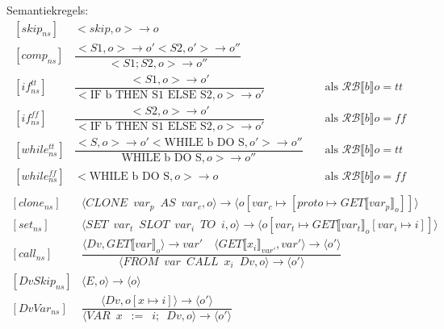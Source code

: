 \documentclass[12pt]{article}
\newcommand{\RB}{\mathcal{RB}}
\begin{document}
Semantiekregels:\\
\renewcommand*{\arraystretch}{2.5}
\[
\begin{matrix}
[skip_{ns}]  & <skip, o> \rightarrow o\\
[comp_{ns}]  & \dfrac{<S1, o> \rightarrow o' <S2, o'> \rightarrow o''}{<S1;S2, o> \rightarrow o''}\\
[if_{ns}^{tt}] & \dfrac{<S1, o> \rightarrow o'}{<\mbox{IF b THEN S1 ELSE S2}, o> \rightarrow o'} &&\mbox{ als }\RB \llbracket b \rrbracket o = tt\\
[if_{ns}^{ff}] & \dfrac{<S2, o> \rightarrow o'}{<\mbox{IF b THEN S1 ELSE S2}, o> \rightarrow o'} &&\mbox{ als }\RB \llbracket b \rrbracket o = ff\\
[while_{ns}^{tt}] & \dfrac{<S, o> \rightarrow o' <\mbox{WHILE b DO S}, o'> \rightarrow o''}{\mbox{WHILE b DO S}, o> \rightarrow o''} &&\mbox{ als }\RB \llbracket b \rrbracket o = tt\\
[while_{ns}^{ff}] & <\mbox{WHILE b DO S}, o> \rightarrow o &&\mbox{ als }\RB \llbracket b \rrbracket o = ff\\
\end{matrix}
\]
\[
\begin{matrix}
[clone_{ns}] &
\langle CLONE \enspace var_p \enspace AS \enspace var_c, o\rangle 
\rightarrow
\langle o[var_c \mapsto [proto \mapsto GET\llbracket var_p \rrbracket_o]]\rangle\\
[set_{ns}] &
\langle SET \enspace var_t \enspace SLOT \enspace var_i \enspace TO \enspace i, o \rangle
\rightarrow
\langle o[var_t \mapsto GET\llbracket var_t \rrbracket_o[var_i \mapsto i]]\rangle\\
[call_{ns}] &
\dfrac
{
	\langle Dv, GET\llbracket var \rrbracket_o \rangle \rightarrow var\prime
	\quad
	\langle  GET\llbracket x_i \rrbracket_{var\prime}, var\prime \rangle
	\rightarrow
	\langle o\prime \rangle
}
{
	\langle FROM \enspace var \enspace CALL \enspace x_i \enspace Dv,o \rangle
	\rightarrow
	\langle o\prime \rangle
}\\
[DvSkip_{ns}] &
\langle E,o \rangle \rightarrow \langle o \rangle\\
[DvVar_{ns}] &
\dfrac
{	\langle Dv,o[x \mapsto i] \rangle \rightarrow \langle o\prime \rangle }
{
	\langle VAR \enspace x \enspace := \enspace i; \enspace Dv, o \rangle
	\rightarrow
	\langle o\prime \rangle
}

\end{matrix}
\]

\appendix
\end{document}
